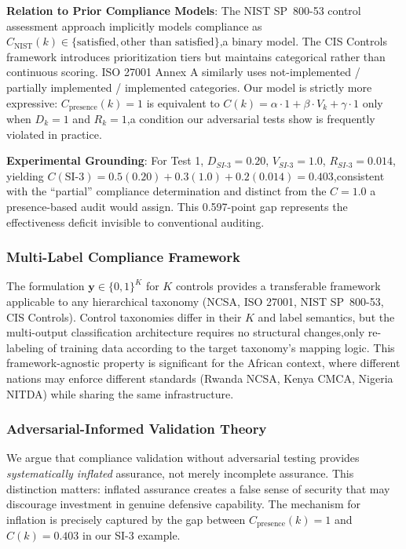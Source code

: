 \documentclass[futureinternet,article,submit,pdftex,moreauthors]{Definitions/mdpi}
\begin{document}
\textbf{Relation to Prior Compliance Models}: The NIST SP~800-53 control assessment approach
implicitly models compliance as $C_{\text{NIST}}(k) \in \{\text{satisfied}, \text{other than
satisfied}\}$,a binary model. The CIS Controls framework introduces prioritization tiers but
maintains categorical rather than continuous scoring. ISO 27001 Annex A similarly uses
not-implemented / partially implemented / implemented categories. Our model is strictly more
expressive: $C_{\text{presence}}(k) = 1$ is equivalent to $C(k) = \alpha \cdot 1 + \beta \cdot
V_k + \gamma \cdot 1$ only when $D_k = 1$ and $R_k = 1$,a condition our adversarial tests
show is frequently violated in practice.

\textbf{Experimental Grounding}: For Test 1, $D_{SI\text{-}3} = 0.20$, $V_{SI\text{-}3} = 1.0$,
$R_{SI\text{-}3} = 0.014$, yielding
$C(\text{SI-3}) = 0.5(0.20) + 0.3(1.0) + 0.2(0.014) = 0.403$,consistent with the
``partial'' compliance determination and distinct from the $C = 1.0$ a presence-based audit
would assign. This 0.597-point gap represents the effectiveness deficit invisible to
conventional auditing.

\subsubsection{Multi-Label Compliance Framework}

The formulation $\mathbf{y} \in \{0,1\}^K$ for $K$ controls provides a transferable
framework applicable to any hierarchical taxonomy (NCSA, ISO 27001, NIST SP~800-53, CIS
Controls). Control taxonomies differ in their $K$ and label semantics, but the multi-output
classification architecture requires no structural changes,only re-labeling of training data
according to the target taxonomy's mapping logic. This framework-agnostic property is
significant for the African context, where different nations may enforce different standards
(Rwanda NCSA, Kenya CMCA, Nigeria NITDA) while sharing the same infrastructure.

\subsubsection{Adversarial-Informed Validation Theory}

We argue that compliance validation without adversarial testing provides \textit{systematically
inflated} assurance, not merely incomplete assurance. This distinction matters: inflated
assurance creates a false sense of security that may discourage investment in genuine
defensive capability. The mechanism for inflation is precisely captured by the gap between
$C_{\text{presence}}(k) = 1$ and $C(k) = 0.403$ in our SI-3 example.
\end{document}
